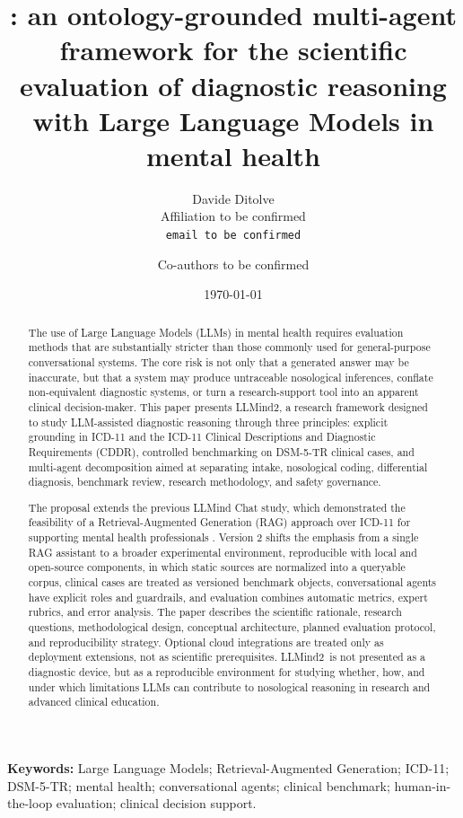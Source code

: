 \documentclass[11pt,a4paper]{article}
\title{\textbf{\llmind: an ontology-grounded multi-agent framework for the scientific evaluation of diagnostic reasoning with Large Language Models in mental health}}
\author{
  Davide Ditolve\\
  \small Affiliation to be confirmed\\
  \small \texttt{email to be confirmed}
  \and
  Co-authors to be confirmed
}
\date{\today}
\newcommand{\llmind}{LLMind2}
\begin{document}
\maketitle

\begin{abstract}
The use of Large Language Models (LLMs) in mental health requires evaluation methods that are substantially stricter than those commonly used for general-purpose conversational systems. The core risk is not only that a generated answer may be inaccurate, but that a system may produce untraceable nosological inferences, conflate non-equivalent diagnostic systems, or turn a research-support tool into an apparent clinical decision-maker. This paper presents \llmind, a research framework designed to study LLM-assisted diagnostic reasoning through three principles: explicit grounding in ICD-11 and the ICD-11 Clinical Descriptions and Diagnostic Requirements (CDDR), controlled benchmarking on DSM-5-TR clinical cases, and multi-agent decomposition aimed at separating intake, nosological coding, differential diagnosis, benchmark review, research methodology, and safety governance.

The proposal extends the previous LLMind Chat study, which demonstrated the feasibility of a Retrieval-Augmented Generation (RAG) approach over ICD-11 for supporting mental health professionals \citep{cremaschi2025decoding}. Version 2 shifts the emphasis from a single RAG assistant to a broader experimental environment, reproducible with local and open-source components, in which static sources are normalized into a queryable corpus, clinical cases are treated as versioned benchmark objects, conversational agents have explicit roles and guardrails, and evaluation combines automatic metrics, expert rubrics, and error analysis. The paper describes the scientific rationale, research questions, methodological design, conceptual architecture, planned evaluation protocol, and reproducibility strategy. Optional cloud integrations are treated only as deployment extensions, not as scientific prerequisites. \llmind\ is not presented as a diagnostic device, but as a reproducible environment for studying whether, how, and under which limitations LLMs can contribute to nosological reasoning in research and advanced clinical education.
\end{abstract}

\noindent\textbf{Keywords:} Large Language Models; Retrieval-Augmented Generation; ICD-11; DSM-5-TR; mental health; conversational agents; clinical benchmark; human-in-the-loop evaluation; clinical decision support.
\end{document}
